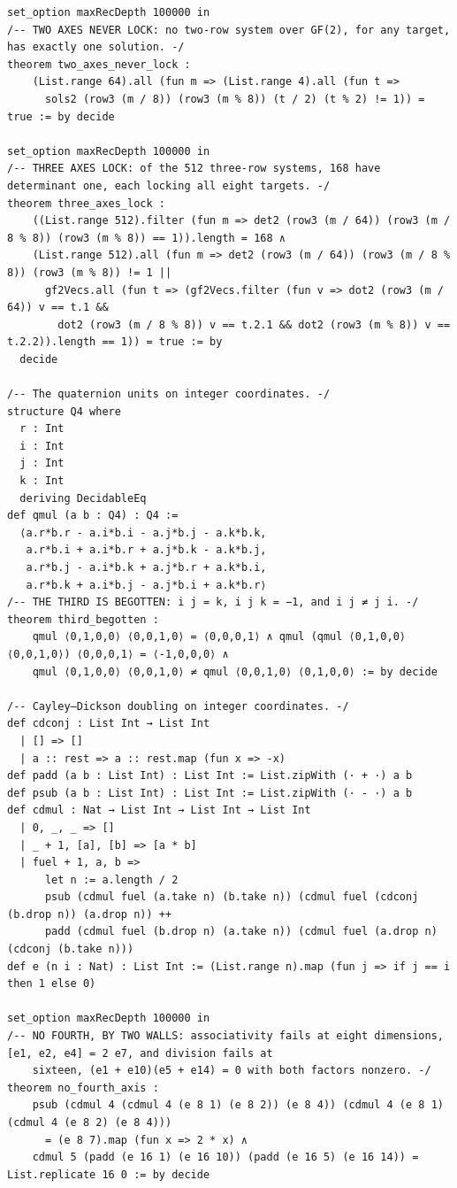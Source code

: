 \documentclass[10pt,twocolumn]{article}
\begin{document}
\begin{Verbatim}
set_option maxRecDepth 100000 in
/-- TWO AXES NEVER LOCK: no two-row system over GF(2), for any target, has exactly one solution. -/
theorem two_axes_never_lock :
    (List.range 64).all (fun m => (List.range 4).all (fun t =>
      sols2 (row3 (m / 8)) (row3 (m % 8)) (t / 2) (t % 2) != 1)) = true := by decide

set_option maxRecDepth 100000 in
/-- THREE AXES LOCK: of the 512 three-row systems, 168 have determinant one, each locking all eight targets. -/
theorem three_axes_lock :
    ((List.range 512).filter (fun m => det2 (row3 (m / 64)) (row3 (m / 8 % 8)) (row3 (m % 8)) == 1)).length = 168 ∧
    (List.range 512).all (fun m => det2 (row3 (m / 64)) (row3 (m / 8 % 8)) (row3 (m % 8)) != 1 ||
      gf2Vecs.all (fun t => (gf2Vecs.filter (fun v => dot2 (row3 (m / 64)) v == t.1 &&
        dot2 (row3 (m / 8 % 8)) v == t.2.1 && dot2 (row3 (m % 8)) v == t.2.2)).length == 1)) = true := by
  decide

/-- The quaternion units on integer coordinates. -/
structure Q4 where
  r : Int
  i : Int
  j : Int
  k : Int
  deriving DecidableEq
def qmul (a b : Q4) : Q4 :=
  ⟨a.r*b.r - a.i*b.i - a.j*b.j - a.k*b.k,
   a.r*b.i + a.i*b.r + a.j*b.k - a.k*b.j,
   a.r*b.j - a.i*b.k + a.j*b.r + a.k*b.i,
   a.r*b.k + a.i*b.j - a.j*b.i + a.k*b.r⟩
/-- THE THIRD IS BEGOTTEN: i j = k, i j k = −1, and i j ≠ j i. -/
theorem third_begotten :
    qmul ⟨0,1,0,0⟩ ⟨0,0,1,0⟩ = ⟨0,0,0,1⟩ ∧ qmul (qmul ⟨0,1,0,0⟩ ⟨0,0,1,0⟩) ⟨0,0,0,1⟩ = ⟨-1,0,0,0⟩ ∧
    qmul ⟨0,1,0,0⟩ ⟨0,0,1,0⟩ ≠ qmul ⟨0,0,1,0⟩ ⟨0,1,0,0⟩ := by decide

/-- Cayley–Dickson doubling on integer coordinates. -/
def cdconj : List Int → List Int
  | [] => []
  | a :: rest => a :: rest.map (fun x => -x)
def padd (a b : List Int) : List Int := List.zipWith (· + ·) a b
def psub (a b : List Int) : List Int := List.zipWith (· - ·) a b
def cdmul : Nat → List Int → List Int → List Int
  | 0, _, _ => []
  | _ + 1, [a], [b] => [a * b]
  | fuel + 1, a, b =>
      let n := a.length / 2
      psub (cdmul fuel (a.take n) (b.take n)) (cdmul fuel (cdconj (b.drop n)) (a.drop n)) ++
      padd (cdmul fuel (b.drop n) (a.take n)) (cdmul fuel (a.drop n) (cdconj (b.take n)))
def e (n i : Nat) : List Int := (List.range n).map (fun j => if j == i then 1 else 0)

set_option maxRecDepth 100000 in
/-- NO FOURTH, BY TWO WALLS: associativity fails at eight dimensions, [e1, e2, e4] = 2 e7, and division fails at
    sixteen, (e1 + e10)(e5 + e14) = 0 with both factors nonzero. -/
theorem no_fourth_axis :
    psub (cdmul 4 (cdmul 4 (e 8 1) (e 8 2)) (e 8 4)) (cdmul 4 (e 8 1) (cdmul 4 (e 8 2) (e 8 4)))
      = (e 8 7).map (fun x => 2 * x) ∧
    cdmul 5 (padd (e 16 1) (e 16 10)) (padd (e 16 5) (e 16 14)) = List.replicate 16 0 := by decide


\end{Verbatim}
\end{document}
